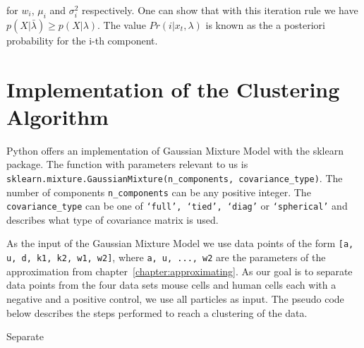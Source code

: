 for $w_i$, $\mu_i$ and $\sigma_i^2$ respectively. One can show that with this iteration rule we have $p(X|\bar{\lambda}) \geq p(X|\lambda)$. The value $Pr(i|x_t, \lambda)$ is known as the a posteriori probability for the i-th component.


\section{Implementation of the Clustering Algorithm}

Python offers an implementation of Gaussian Mixture Model with the sklearn package. The function with parameters relevant to us is \texttt{sklearn.mixture.GaussianMixture(n\_components, covariance\_type)}. The number of components \texttt{n\_components} can be any positive integer. The \texttt{covariance\_type} can be one of \texttt{‘full’, ‘tied’, ‘diag’} or \texttt{‘spherical’} and describes what type of covariance matrix is used.

As the input of the Gaussian Mixture Model we use data points of the form \texttt{[a, u, d, k1, k2, w1, w2]}, where \texttt{a, u, ..., w2} are the parameters of the approximation from chapter~\ref{chapter:approximating}. As our goal is to separate data points from the four data sets mouse cells and human cells each with a negative and a positive control, we use all particles as input. The pseudo code below describes the steps performed to reach a clustering of the data.

\begin{algorithm}[H] \label{alg:separate}
	\SetAlgoLined
	\DontPrintSemicolon
	\LinesNumbered
	\caption{Separate}
	
	
	\BlankLine
\end{algorithm}
\vspace{1cm}

